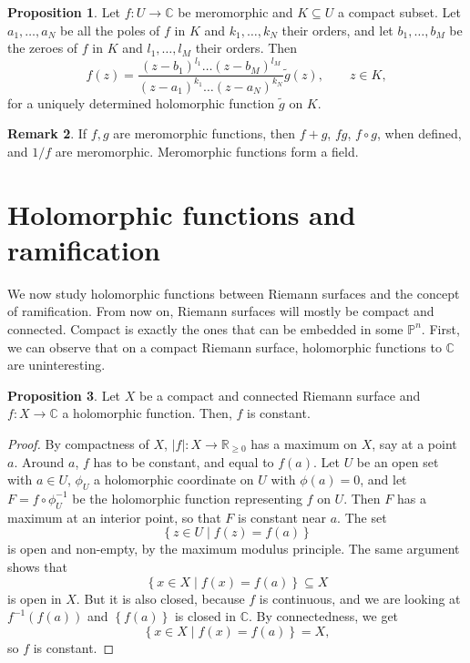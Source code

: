 \documentclass{article}
\newcommand{\R}{\mathbb{R}}
\newcommand{\C}{\mathbb{C}}
\renewcommand{\P}{\mathbb{P}}
\newcommand{\rb}[1]{\left( #1 \right)}
\newcommand{\cb}[1]{\left\{ #1 \right\}}
\newcommand{\abs}[1]{\left\lvert #1 \right\rvert}
\theoremstyle{definition}\newtheorem{definition}{Definition}[section]
\theoremstyle{definition}\newtheorem{notation}[definition]{Notation}
\theoremstyle{definition}\newtheorem{remark}[definition]{Remark}
\theoremstyle{definition}\newtheorem{example1}[definition]{Example}
\theoremstyle{definition}\newtheorem{fact}{Fact}
\theoremstyle{definition}\newtheorem{exercise}{Exercise}
\theoremstyle{definition}\newtheorem*{example2}{Example}
\newtheorem{proposition}[definition]{Proposition}
\begin{document}
\begin{proposition}
Let $ f : U \to \C $ be meromorphic and $ K \subseteq U $ a compact subset. Let $ a_1, \dots, a_N $ be all the poles of $ f $ in $ K $ and $ k_1, \dots, k_N $ their orders, and let $ b_1, \dots, b_M $ be the zeroes of $ f $ in $ K $ and $ l_1, \dots, l_M $ their orders. Then
$$ f\rb{z} = \dfrac{\rb{z - b_1}^{l_1} \dots \rb{z - b_M}^{l_M}}{\rb{z - a_1}^{k_1} \dots \rb{z - a_N}^{k_N}}\widetilde{g}\rb{z}, \qquad z \in K, $$
for a uniquely determined holomorphic function $ \widetilde{g} $ on $ K $.
\end{proposition}

\begin{remark}
If $ f, g $ are meromorphic functions, then $ f + g $, $ fg $, $ f \circ g $, when defined, and $ 1 / f $ are meromorphic. Meromorphic functions form a field.
\end{remark}

\pagebreak

\section{Holomorphic functions and ramification}

We now study holomorphic functions between Riemann surfaces and the concept of ramification. From now on, Riemann surfaces will mostly be compact and connected. Compact is exactly the ones that can be embedded in some $ \P^n $. First, we can observe that on a compact Riemann surface, holomorphic functions to $ \C $ are uninteresting.

\begin{proposition}
Let $ X $ be a compact and connected Riemann surface and $ f : X \to \C $ a holomorphic function. Then, $ f $ is constant.
\end{proposition}

\begin{proof}
By compactness of $ X $, $ \abs{f} : X \to \R_{\ge 0} $ has a maximum on $ X $, say at a point $ a $. Around $ a $, $ f $ has to be constant, and equal to $ f\rb{a} $. Let $ U $ be an open set with $ a \in U $, $ \phi_U $ a holomorphic coordinate on $ U $ with $ \phi\rb{a} = 0 $, and let $ F = f \circ \phi_U^{-1} $ be the holomorphic function representing $ f $ on $ U $. Then $ F $ has a maximum at an interior point, so that $ F $ is constant near $ a $. The set
$$ \cb{z \in U \mid f\rb{z} = f\rb{a}} $$
is open and non-empty, by the maximum modulus principle. The same argument shows that
$$ \cb{x \in X \mid f\rb{x} = f\rb{a}} \subseteq X $$
is open in $ X $. But it is also closed, because $ f $ is continuous, and we are looking at $ f^{-1}\rb{f\rb{a}} $ and $ \cb{f\rb{a}} $ is closed in $ \C $. By connectedness, we get
$$ \cb{x \in X \mid f\rb{x} = f\rb{a}} = X, $$
so $ f $ is constant.
\end{proof}
\end{document}
